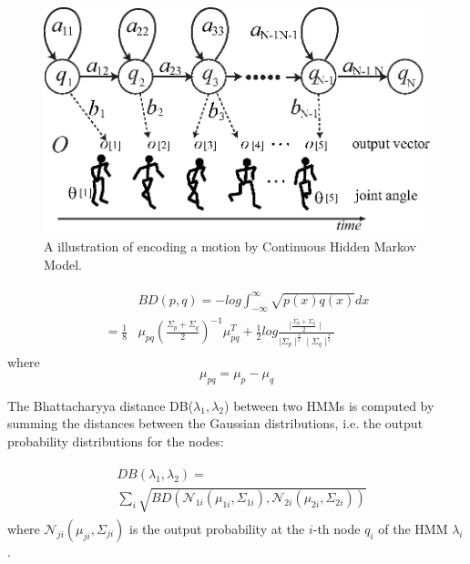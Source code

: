 \begin{figure}[t!]
  \centering
  \includegraphics[width=14cm]{./fig_cha5/chmm.eps}
  \caption{ \scriptsize{A illustration of encoding a motion by Continuous Hidden Markov Model\protect\footnotemark.}
}
    \label{fig:chmm}
\end{figure}


\begin{align}
\begin{split}
&BD(p,q) = -log\int^{\infty}_{-\infty}\sqrt{p(x)q(x)}dx \\
=\frac{1}{8}&\mu_{pq}\left({\frac{\Sigma_p+\Sigma_q}{2}}\right)^{-1}\mu_{pq}^T +\frac{1}{2}log{\frac{\mid\frac{\Sigma_p+\Sigma_q}{2}\mid}{\mid\Sigma_p\mid^{\frac{1}{2}}\mid \Sigma_q\mid^{\frac{1}{2}}}}
\end{split}
\end{align}
where
\begin{equation}
\mu_{pq} = \mu_p - \mu_q
\end{equation}

The Bhattacharyya distance DB($\lambda_1, \lambda_2$) between two HMMs is computed by summing the distances between the Gaussian distributions, i.e. the output probability distributions for the nodes:

\begin{align}
\begin{split}
&DB(\lambda_1, \lambda_2) = \\
&\sum_i\sqrt{BD\left(\mathcal{N}_{1i}\left(\mu_{1i},\Sigma_{1i}\right), \mathcal{N}_{2i}\left(\mu_{2i},\Sigma_{2i}\right)\right)}
\end{split}
\end{align}
where $\mathcal{N}_{ji}(\mu_{ji},\Sigma_{ji})$ is the output probability at the $i$-th node $q_i$ of the HMM $\lambda_i$.

